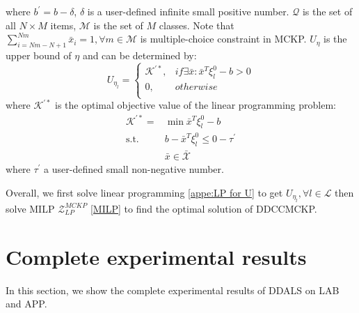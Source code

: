 \documentclass[lettersize,journal]{IEEEtran}
\begin{document}
where $b^{'} = b-\delta$, $\delta $ is a user-defined infinite small positive number. 
$\mathcal{Q}$ is the set of all $N\times M$ items, $\mathcal{M}$ is the set of $M$ classes. 
Note that $\sum _{i=Nm-N+1}^{Nm} \bar{x}_i = 1,\forall m\in\mathcal{M}$ is multiple-choice constraint in MCKP. 
$U_{\eta}$ is the upper bound of $\eta$ and can be determined by:
\begin{equation}
    U_{\eta_l}=\left\{
        \begin{array}{lr}
        \mathcal{K}^{'*}, &if \exists \bar{x}: \bar{x}^{T}\xi_l^{0}-b>0\\
        0, &otherwise\\
        \end{array}
    \right.
\end{equation}
where $\mathcal{K}^{'*}$ is the optimal objective value of the linear programming problem:
\begin{equation}
    \begin{aligned}
    \mathcal{K}^{'*} = &\min \bar{x}^{T}\xi_l^{0}-b\\
    \text{s.t.} & b-\bar{x}^{T}\xi_l^{0}\leq 0-\tau ^{'}\\
    & \bar{x} \in \mathcal{\bar{X}}
    \end{aligned}
    \label{appe:LP for U}
\end{equation}
where $\tau^{'}$ a user-defined small non-negative number.

Overall, we first solve linear programming \ref{appe:LP for U} to get $U_{\eta_l},\forall l \in \mathcal{L}$ then solve MILP $\mathcal{Z}_{LP}^{MCKP}$ \ref{MILP} to find the optimal solution of DDCCMCKP.

\section{Complete experimental results}
In this section, we show the complete experimental results of DDALS on LAB and APP.
\end{document}
